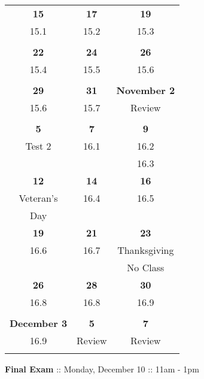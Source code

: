 \documentclass[letterpaper,10pt]{article}
\begin{document}
\begin{center}
\begin{tabular}{|c|c|c|}
 \hfill \bf{15} & \hfill\bf{17} & \hfill\bf{19} \\
  15.1 & 15.2 &   15.3    \\
  &  &       \\ \hline
\hfill\bf{22} &  \hfill\bf{24} & \hfill\bf{26} \\
 15.4 & 15.5 &   15.6    \\
  &  &       \\ \hline
 \hfill\bf{29} & \hfill \bf{31} &\bf{November} \hfill\bf{2} \\
 15.6 & 15.7 &   Review    \\
  &  &       \\ \hline
 \hfill\bf{5} &\hfill\bf{7} & \hfill\bf{9} \\
 Test 2 &  16.1   & 16.2  \\
  &     &  16.3  \\ \hline
 \hfill\bf{12} &\hfill\bf{14} & \hfill\bf{16} \\
  Veteran's & 16.4 &  16.5     \\
  Day &  &       \\ \hline
 \hfill\bf{19} & \hfill\bf{21} & \hfill\bf{23} \\
 16.6 & 16.7    &  Thanksgiving   \\
  &     &  No Class   \\ \hline
 \hfill\bf{26} & \hfill\bf{28} &\hfill\bf{30} \\
  16.8 & 16.8 &  16.9     \\
  &  &       \\ \hline
            
 \bf{December} \hfill\bf{3} &\hfill\bf{5} & \hfill\bf{7} \\
16.9 &  Review   &  Review   \\
  &     &     \\ \hline
              



\end{tabular}
\end{center}
\begin{center} {\bf Final Exam} :: Monday, December 10 :: 11am - 1pm\end{center}
\end{document}
